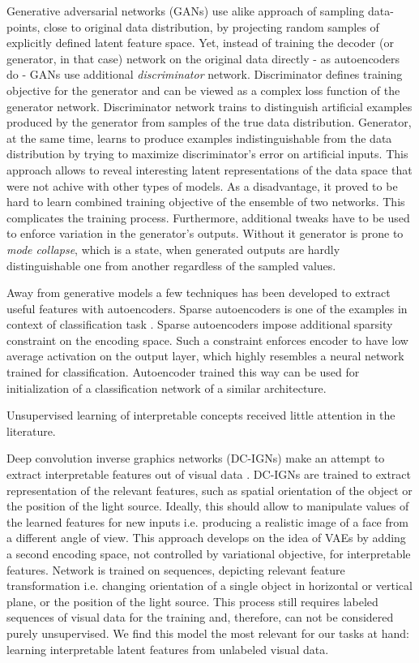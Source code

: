 Generative adversarial networks (GANs) \cite{Goodfellow2014} use alike approach of sampling data-points, close to original data distribution, by projecting random samples of explicitly defined latent feature space.
Yet, instead of training the decoder (or generator, in that case) network on the original data directly - as autoencoders do - GANs use additional \textit{discriminator} network.
Discriminator defines training objective for the generator and can be viewed as a complex loss function of the generator network.
Discriminator network trains to distinguish artificial examples produced by the generator from samples of the true data distribution.
Generator, at the same time, learns to produce examples indistinguishable from the data distribution by trying to maximize discriminator's error on artificial inputs.
This approach allows to reveal interesting latent representations of the data space that were not achive with other types of models.
As a disadvantage, it proved to be hard to learn combined training objective of the ensemble of two networks.
This complicates the training process.
Furthermore, additional tweaks have to be used to enforce variation in the generator's outputs.
Without it generator is prone to \textit{mode collapse}, which is a state, when generated outputs are hardly distinguishable one from another regardless of the sampled values.

Away from generative models a few techniques has been developed to extract useful features with autoencoders.
Sparse autoencoders is one of the examples in context of classification task \cite{Ng2011, Makhzani2013, Masci2011}.
Sparse autoencoders impose additional sparsity constraint on the encoding space.
Such a constraint enforces encoder to have low average activation on the output layer, which highly resembles a neural network trained for classification.
Autoencoder trained this way can be used for initialization of a classification network of a similar architecture.

Unsupervised learning of interpretable concepts received little attention in the literature.

Deep convolution inverse graphics networks (DC-IGNs) make an attempt to extract interpretable features out of visual data \cite{Kulkarni2015}.
DC-IGNs are trained to extract representation of the relevant features, such as spatial orientation of the object or the position of the light source.
Ideally, this should allow to manipulate values of the learned features for new inputs i.e. producing a realistic image of a face from a different angle of view.
This approach develops on the idea of VAEs by adding a second encoding space, not controlled by variational objective, for interpretable features.
Network is trained on sequences, depicting relevant feature transformation i.e. changing orientation of a single object in horizontal or vertical plane, or the position of the light source.
This process still requires labeled sequences of visual data for the training and, therefore, can not be considered purely unsupervised.
We find this model the most relevant for our tasks at hand: learning interpretable latent features from unlabeled visual data.

